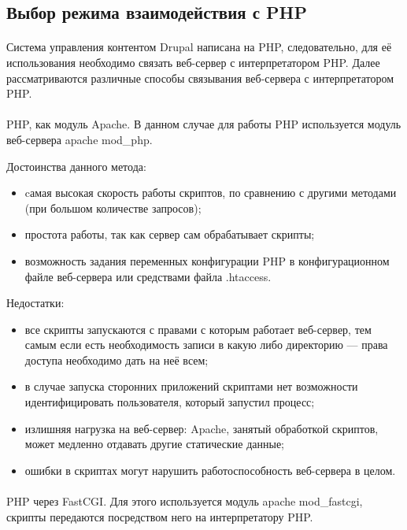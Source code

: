 \subsection{Выбор режима взаимодействия с PHP}
\label{ssec:choice_php_communication}

\paragraph{}
Система управления контентом Drupal написана на PHP, следовательно, 
для её использования необходимо связать веб-сервер с интерпретатором PHP. 
Далее рассматриваются различные способы связывания веб-сервера с 
интерпретатором PHP.

\paragraph{}
PHP, как модуль Apache. В данном случае для работы PHP используется модуль веб-сервера apache mod\_php.

Достоинства данного метода:
\begin{itemize}
\item
  cамая высокая скорость работы скриптов, по сравнению с другими методами
  (при большом количестве запросов);
\item
  простота работы, так как сервер сам обрабатывает скрипты;
\item
  возможность задания переменных конфигурации PHP в конфигурационном файле веб-сервера или средствами файла .htaccess.
\end{itemize}

Недостатки:
\begin{itemize}
\item все скрипты запускаются с правами с которым работает веб-сервер, 
  тем самым если есть необходимость записи в какую либо директорию ---
  права доступа необходимо дать на неё всем;
\item
  в случае запуска сторонних приложений скриптами нет возможности
  идентифицировать пользователя, который запустил процесс;
\item
  излишняя нагрузка на веб-сервер: Apache, занятый обработкой скриптов,
  может медленно отдавать другие статические данные;
\item
  ошибки в скриптах могут нарушить работоспособность веб-сервера в целом.
\end{itemize}

\paragraph{}
PHP через FastCGI. Для этого используется модуль apache mod\_fastcgi,
скрипты передаются посредством него на интерпретатору PHP.


